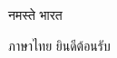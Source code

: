 \documentclass{article}
\begin{document}
{\devanagarifont{}नमस्ते भारत}

{\thaifont{}ภาษาไทย ยินดีต้อนรับ}
\end{document}
